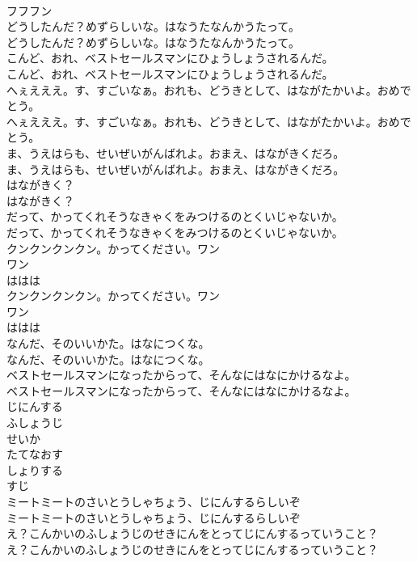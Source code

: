 \documentclass[8pt]{extreport}
\begin{document}
\begin{CJK}{UTF8}{min}
\\	フフフン
\\	どうしたんだ？めずらしいな。はなうたなんかうたって。
\\	どうしたんだ？めずらしいな。はなうたなんかうたって。
\\	こんど、おれ、ベストセールスマンにひょうしょうされるんだ。
\\	こんど、おれ、ベストセールスマンにひょうしょうされるんだ。
\\	へぇえええ。す、すごいなぁ。おれも、どうきとして、はながたかいよ。おめでとう。
\\	へぇえええ。す、すごいなぁ。おれも、どうきとして、はながたかいよ。おめでとう。
\\	ま、うえはらも、せいぜいがんばれよ。おまえ、はながきくだろ。
\\	ま、うえはらも、せいぜいがんばれよ。おまえ、はながきくだろ。
\\	はながきく？
\\	はながきく？
\\	だって、かってくれそうなきゃくをみつけるのとくいじゃないか。
\\	だって、かってくれそうなきゃくをみつけるのとくいじゃないか。
\\	クンクンクンクン。かってください。ワン
\\	ワン
\\	ははは
\\	クンクンクンクン。かってください。ワン
\\	ワン
\\	ははは
\\	なんだ、そのいいかた。はなにつくな。
\\	なんだ、そのいいかた。はなにつくな。
\\	ベストセールスマンになったからって、そんなにはなにかけるなよ。
\\	ベストセールスマンになったからって、そんなにはなにかけるなよ。
\\	じにんする
\\	ふしょうじ
\\	せいか
\\	たてなおす
\\	しょりする
\\	すじ
\\	ミートミートのさいとうしゃちょう、じにんするらしいぞ
\\	ミートミートのさいとうしゃちょう、じにんするらしいぞ
\\	え？こんかいのふしょうじのせきにんをとってじにんするっていうこと？
\\	え？こんかいのふしょうじのせきにんをとってじにんするっていうこと？

\end{CJK}
\end{document}

